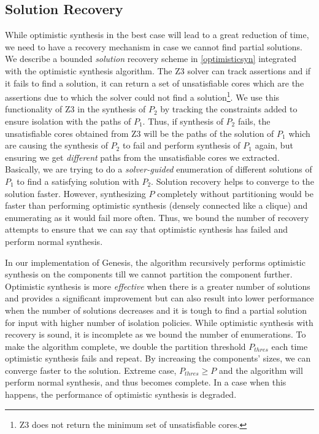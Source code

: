 \subsection{Solution Recovery}
While optimistic synthesis in the best case will lead to a great reduction of time, we need to have a recovery mechanism in case we cannot find partial solutions.
 We describe a bounded \emph{solution} recovery scheme in \cref{optimisticsyn} integrated with the optimistic synthesis algorithm. 
 The Z3 solver can track assertions and if it fails to find a solution, it can return a set of unsatisfiable cores which are the assertions due to which the solver could not find a solution\footnote{Z3 does not return the minimum set of unsatisfiable cores.}. 
 We use this functionality of Z3 in the synthesis of $P_2$ by tracking the constraints added to ensure isolation with the paths of $P_1$.
  Thus, if synthesis of $P_2$ fails, the unsatisfiable cores obtained from Z3 will be the paths of the solution of $P_1$ which are causing the synthesis of $P_2$ to fail and perform synthesis of $P_1$ again, but ensuring we get \emph{different} paths from the unsatisfiable cores we extracted. 
 Basically, we are trying to do a \emph{solver-guided} enumeration of different solutions of $P_1$ to find a satisfying solution with $P_2$.
 Solution recovery helps to converge to the solution faster. However, synthesizing $P$ completely without partitioning would be faster than performing optimistic synthesis (densely connected like a clique) and enumerating as it would fail more often. Thus, we bound the number of recovery attempts to ensure that we can say that optimistic synthesis has failed and perform normal synthesis. 
 
 In our implementation of Genesis, the algorithm recursively performs optimistic synthesis on the components till we cannot partition the component further.
  Optimistic synthesis is more \emph{effective} when there is a greater number of solutions and provides a significant improvement but can also result into lower
   performance when the number of solutions decreases and it is tough to find a partial solution for input with higher number of isolation policies. While optimistic
    synthesis with recovery is sound, it is incomplete as we bound the number of enumerations. To make the algorithm complete, we double the partition threshold $P_{thres}$ each time optimistic synthesis fails and repeat. By increasing the components' sizes, we can converge faster to the solution. Extreme case, $P_{thres} \geq P$ and the algorithm will perform normal synthesis, and thus becomes complete. In a case when this happens, the performance of optimistic synthesis is degraded.  
%
